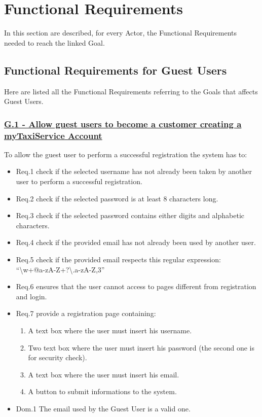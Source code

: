 \section{Functional Requirements}
	In this section are described, for every Actor, the Functional Requirements needed to reach the linked Goal.

		\subsection{Functional Requirements for Guest Users}
		Here are listed all the Functional Requirements referring to the Goals that affects Guest Users.

			\subsubsection{\lbrack \hyperref[sec:g1]{G.1 - Allow guest users to become a customer creating a myTaxiService Account}\rbrack}\label{sec:frs1}
			To allow the guest user to perform a successful registration the system has to:

				\begin{itemize}
					\item \lbrack Req.1\rbrack \label{sec:fr1_g1} check if the selected username has not already been taken by another user to perform a successful registration.
					\item \lbrack Req.2\rbrack \label{sec:fr2_g1} check if the selected password is at least 8 characters long.
					\item \lbrack Req.3\rbrack \label{sec:fr3_g1} check if the selected password contains either digits and alphabetic characters.
					\item \lbrack Req.4\rbrack \label{sec:fr4_g1} check if the provided email has not already been used by another user.
					\item \lbrack Req.5\rbrack \label{sec:fr5_g1} check if the provided email respects this regular expression:\\ \textquotedblleft\textbackslash w+@\lbrack a-zA-Z\textunderscore\rbrack +?\textbackslash .\lbrack a-zA-Z\rbrack{},3\textbraceright\textdollar\textquotedblright
					\item \lbrack Req.6\rbrack \label{sec:fr6_g1} ensures that the user cannot access to pages different from registration and login.
					\item \lbrack Req.7\rbrack \label{sec:fr7_g1} provide a registration page containing:
						\begin{enumerate}
							\item A text box where the user must insert his username.
							\item Two text box where the user must insert his password (the second one is for security check).
							\item A text box where the user must insert his email. 
							\item A button to submit informations to the system.
						\end{enumerate}
					\item \lbrack Dom.1\rbrack \label{sec:da1_g1} The email used by the Guest User is a valid one.
				\end{itemize}

